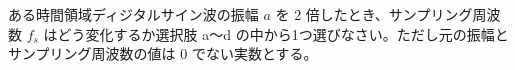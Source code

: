 ある時間領域ディジタルサイン波の振幅 $a$ を $2$ 倍したとき、サンプリング周波数 $f_s$ はどう変化するか選択肢 a〜d の中から1つ選びなさい。ただし元の振幅とサンプリング周波数の値は $0$ でない実数とする。
